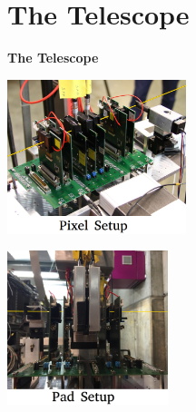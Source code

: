 \documentclass[9pt]{beamer}
\begin{document}
\section{The Telescope}
\begin{frame}
	\begin{alertblock}{
		\begin{center}
			\Large{\textbf{The Telescope}}
		\end{center}}
	\end{alertblock}
	\begin{center}
		\begin{minipage}{5.5cm}
			\centering
			\includegraphics[height=4.5cm]{Pics/telescope2}
		\end{minipage}
		\hspace*{2pt}
		\begin{minipage}{5.5cm}
			\centering
			\includegraphics[height=4.5cm]{Pics/telescope3}
		\end{minipage}
	\end{center}
\end{frame}
\end{document}
